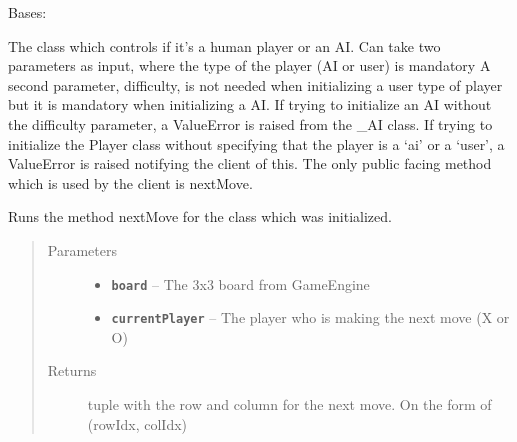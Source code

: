 \documentclass[letterpaper,10pt,english]{sphinxmanual}
\begin{document}
\begin{fulllineitems}
\label{index:Player.Player}
Bases: 

The class which controls if it's a human player or an AI.
Can take two parameters as input, where the type of the player (AI or user) is mandatory
A second parameter, difficulty, is not needed when initializing a user type of player
but it is mandatory when initializing a AI. If trying to initialize an AI without the difficulty
parameter, a ValueError is raised from the \_AI class. If trying to initialize the Player class
without specifying that the player is a `ai' or a `user', a ValueError is raised notifying the client of this.
The only public facing method which is used by the client is nextMove.

\begin{fulllineitems}
\label{index:Player.Player.nextMove}
Runs the method nextMove for the class which was initialized.
\begin{quote}\begin{description}
\item[{Parameters}] \leavevmode\begin{itemize}
\item {} 
\textbf{\texttt{board}} -- The 3x3 board from GameEngine

\item {} 
\textbf{\texttt{currentPlayer}} -- The player who is making the next move (X or O)

\end{itemize}

\item[{Returns}] \leavevmode
tuple with the row and column for the next move. On the form of (rowIdx, colIdx)

\end{description}\end{quote}

\end{fulllineitems}


\end{fulllineitems}

\end{document}
